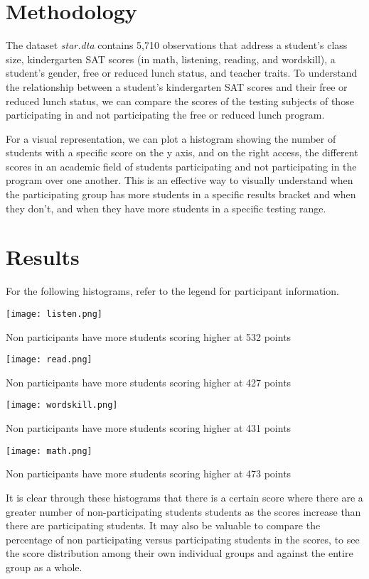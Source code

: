 \documentclass{article}
\begin{document}
\section{Methodology}
The dataset \textit{star.dta} contains 5,710 observations that address a student's class size, kindergarten SAT scores (in math, listening, reading, and wordskill), a student's gender, free or reduced lunch status, and teacher traits. To understand the relationship between a student's kindergarten SAT scores and their free or reduced lunch status, we can compare the scores of the testing subjects of those participating in and not participating the free or reduced lunch program. 
\par For a visual representation, we can plot a histogram showing the number of students with a specific score on the y axis, and on the right access, the different scores in an academic field of students participating and not participating in the program over one another. This is an effective way to visually understand when the participating group has more students in a specific results bracket and when they don't, and when they have more students in a specific testing range. 
\section{Results}
For the following histograms, refer to the legend for participant information.
\begin{center}
\texttt{[image: listen.png]}

Non participants have more students scoring higher at 532 points

\texttt{[image: read.png]}

Non participants have more students scoring higher at 427 points

\texttt{[image: wordskill.png]}

Non participants have more students scoring higher at 431 points

\texttt{[image: math.png]}

Non participants have more students scoring higher at 473 points
\end{center}
It is clear through these histograms that there is a certain score where there are a greater number of non-participating students students as the scores increase than there are participating students. It may also be valuable to compare the percentage of non participating versus participating students in the scores, to see the score distribution among their own individual groups and against the entire group as a whole.
\end{document}
